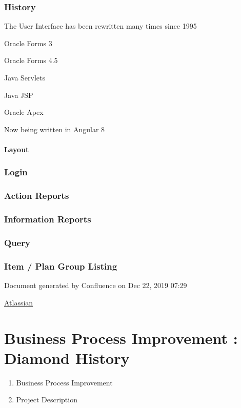 \documentclass[letterpaper,10pt,english]{sphinxmanual}
\begin{document}
\subsection{History}
\label{Introduction/Diamond-History2:history}
The User Interface has been rewritten many times since 1995

Oracle Forms 3

Oracle Forms 4.5

Java Servlets

Java JSP

Oracle Apex

Now being written in Angular 8


\subsubsection{Layout}
\label{Introduction/Diamond-History2:layout}

\subsection{Login}
\label{Introduction/Diamond-History2:login}

\subsection{Action Reports}
\label{Introduction/Diamond-History2:action-reports}

\subsection{Information Reports}
\label{Introduction/Diamond-History2:information-reports}

\subsection{Query}
\label{Introduction/Diamond-History2:query}

\subsection{Item / Plan Group Listing}
\label{Introduction/Diamond-History2:item-plan-group-listing}
Document generated by Confluence on Dec 22, 2019 07:29

\href{http://www.atlassian.com/}{Atlassian}


\chapter{Business Process Improvement : Diamond History}
\label{Introduction/Diamond-History::doc}\label{Introduction/Diamond-History:business-process-improvement-diamond-history}\begin{enumerate}
\item {} 
Business Process Improvement

\item {} 
Project Description

\end{enumerate}
\end{document}
